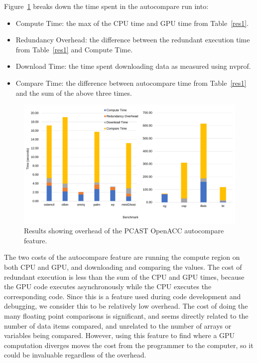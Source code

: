 Figure~\ref{fig:sle_figure} breaks down the time spent in the autocompare run into:
\begin{itemize}
\item Compute Time: the max of the CPU time and GPU time from Table~\ref{res1}.
\item Redundancy Overhead: the difference between the redundant execution time from Table~\ref{res1} and Compute Time.
\item Download Time: the time spent downloading data as measured using nvprof.
\item Compare Time: the difference between autocompare time from Table~\ref{res1} and the sum of the above three times.
\end{itemize}


\begin{figure}[t]
    \centering
    \includegraphics [width=1\linewidth] {npic3.pdf}
    \caption{Results showing overhead of the PCAST OpenACC autocompare feature.}
    \label{fig:sle_figure}
\end{figure}


The two costs of the autocompare feature are running the compute region on both CPU and GPU, and downloading and comparing the values.
The cost of redundant execution is less than the sum of the CPU and GPU times, because the GPU code executes asynchronously while the CPU executes the corresponding code.
Since this is a feature used during code development and debugging, we consider this to be relatively low overhead.
The cost of doing the many floating point comparisons is significant, and seems directly related to the number of data items compared, and unrelated to the number of arrays or variables being compared.
However, using this feature to find where a GPU computation diverges moves the cost from the programmer to the computer, so it could be invaluable regardless of the overhead.


